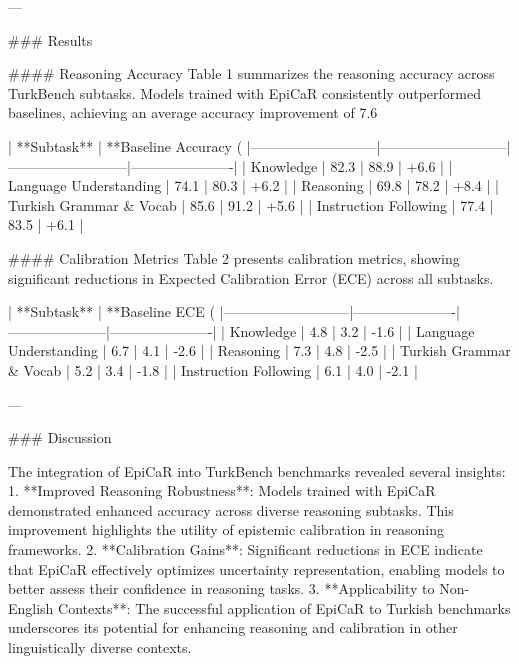---

### Results  

#### Reasoning Accuracy  
Table 1 summarizes the reasoning accuracy across TurkBench subtasks. Models trained with EpiCaR consistently outperformed baselines, achieving an average accuracy improvement of 7.6%

| **Subtask**              | **Baseline Accuracy (%
|---------------------------|---------------------------|--------------------------|----------------------|
| Knowledge                | 82.3                     | 88.9                    | +6.6                |
| Language Understanding   | 74.1                     | 80.3                    | +6.2                |
| Reasoning                | 69.8                     | 78.2                    | +8.4                |
| Turkish Grammar & Vocab  | 85.6                     | 91.2                    | +5.6                |
| Instruction Following    | 77.4                     | 83.5                    | +6.1                |

#### Calibration Metrics  
Table 2 presents calibration metrics, showing significant reductions in Expected Calibration Error (ECE) across all subtasks.

| **Subtask**              | **Baseline ECE (%
|---------------------------|----------------------|---------------------|----------------------|
| Knowledge                | 4.8                 | 3.2                 | -1.6                |
| Language Understanding   | 6.7                 | 4.1                 | -2.6                |
| Reasoning                | 7.3                 | 4.8                 | -2.5                |
| Turkish Grammar & Vocab  | 5.2                 | 3.4                 | -1.8                |
| Instruction Following    | 6.1                 | 4.0                 | -2.1                |

---

### Discussion  

The integration of EpiCaR into TurkBench benchmarks revealed several insights:  
1. **Improved Reasoning Robustness**: Models trained with EpiCaR demonstrated enhanced accuracy across diverse reasoning subtasks. This improvement highlights the utility of epistemic calibration in reasoning frameworks.  
2. **Calibration Gains**: Significant reductions in ECE indicate that EpiCaR effectively optimizes uncertainty representation, enabling models to better assess their confidence in reasoning tasks.  
3. **Applicability to Non-English Contexts**: The successful application of EpiCaR to Turkish benchmarks underscores its potential for enhancing reasoning and calibration in other linguistically diverse contexts.

